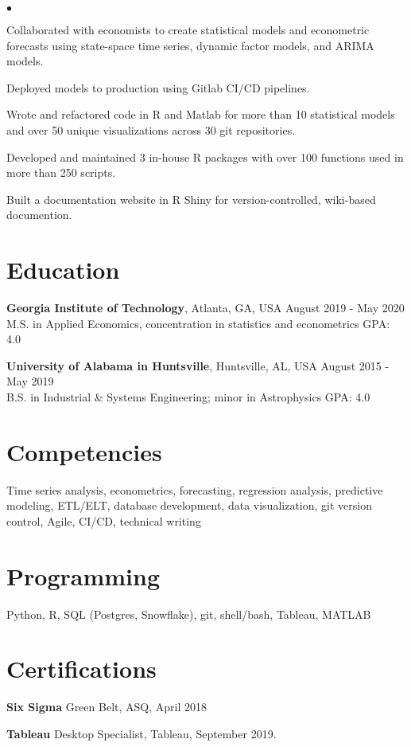 \documentclass[margin, line]{res}
\newenvironment{list2}{
  \begin{list}{$\bullet$}{%
      \setlength{\itemsep}{0.04in}
      \setlength{\parsep}{0in} \setlength{\parskip}{0in}
      \setlength{\topsep}{0.05in} \setlength{\partopsep}{0in} 
      \setlength{\leftmargin}{\dimexpr 26pt-0.05in}}}
    {\end{list}}
\begin{document}
\begin{resume}
    \begin{list2}
        \item Collaborated with economists to create statistical models and econometric forecasts using state-space time series, dynamic factor models, and ARIMA models.
        \item Deployed models to production using Gitlab CI/CD pipelines.
        \item Wrote and refactored code in R and Matlab for more than 10 statistical models and over 50 unique visualizations across 30 git repositories. 
        \item Developed and maintained 3 in-house R packages with over 100 functions used in more than 250 scripts.
        \item Built a documentation website in R Shiny for version-controlled, wiki-based documention.
    \end{list2}


\section{\sc Education }

{\bf Georgia Institute of Technology}, Atlanta, GA, USA \hfill August 2019 - May 2020\\
M.S. in Applied Economics, concentration in statistics and econometrics \hfill GPA: 4.0


{\bf University of Alabama in Huntsville}, Huntsville, AL, USA \hfill August 2015 - May 2019 \\
B.S. in Industrial \& Systems Engineering; minor in Astrophysics \hfill GPA: 4.0

\section{\sc Competencies} 
Time series analysis, econometrics, forecasting, regression analysis, predictive modeling, ETL/ELT, database development, data visualization, git version control, Agile, CI/CD, technical writing

\section{\sc Programming} 
Python, R, SQL (Postgres, Snowflake), git, shell/bash, Tableau, MATLAB

\section{\sc Certifications }
{\bf Six Sigma} Green Belt, ASQ, April 2018
\vspace*{-3mm}

{\bf Tableau} Desktop Specialist, Tableau, September 2019.
\vspace*{-3mm}

\end{resume}
\end{document}

